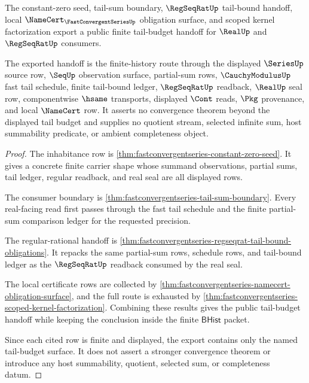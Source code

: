 \begin{theorem}
\label{thm:fastconvergentseries-public-tail-budget-export}
The constant-zero seed, tail-sum boundary, $\RegSeqRatUp$ tail-bound handoff, local $\NameCert_{\FastConvergentSeriesUp}$ obligation surface, and scoped kernel factorization export a public finite tail-budget handoff for $\RealUp$ and $\RegSeqRatUp$ consumers.

The exported handoff is the finite-history route through the displayed $\SeriesUp$ source row, $\SeqUp$ observation surface, partial-sum rows, $\CauchyModulusUp$ fast tail schedule, finite tail-bound ledger, $\RegSeqRatUp$ readback, $\RealUp$ seal row, componentwise $\hsame$ transports, displayed $\Cont$ reads, $\Pkg$ provenance, and local $\NameCert$ row. It asserts no convergence theorem beyond the displayed tail budget and supplies no quotient stream, selected infinite sum, host summability predicate, or ambient completeness object.
\end{theorem}
\begin{proof}
The inhabitance row is \autoref{thm:fastconvergentseries-constant-zero-seed}. It gives a concrete finite carrier shape whose summand observations, partial sums, tail ledger, regular readback, and real seal are all displayed rows.

The consumer boundary is \autoref{thm:fastconvergentseries-tail-sum-boundary}. Every real-facing read first passes through the fast tail schedule and the finite partial-sum comparison ledger for the requested precision.

The regular-rational handoff is \autoref{thm:fastconvergentseries-regseqrat-tail-bound-obligations}. It repacks the same partial-sum rows, schedule rows, and tail-bound ledger as the $\RegSeqRatUp$ readback consumed by the real seal.

The local certificate rows are collected by \autoref{thm:fastconvergentseries-namecert-obligation-surface}, and the full route is exhausted by \autoref{thm:fastconvergentseries-scoped-kernel-factorization}. Combining these results gives the public tail-budget handoff while keeping the conclusion inside the finite $\mathsf{BHist}$ packet.

Since each cited row is finite and displayed, the export contains only the named tail-budget surface. It does not assert a stronger convergence theorem or introduce any host summability, quotient, selected sum, or completeness datum.
\end{proof}

